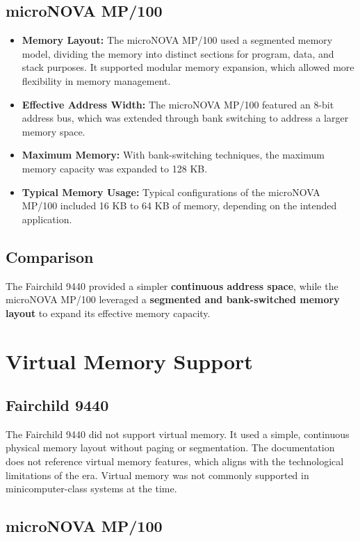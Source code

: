 \documentclass[a4paper,12pt]{article}
\begin{document}
\subsection{microNOVA MP/100}

\begin{itemize}
    \item \textbf{Memory Layout:} The microNOVA MP/100 used a segmented memory model, dividing the memory into distinct sections for program, data, and stack purposes. It supported modular memory expansion, which allowed more flexibility in memory management.
    \item \textbf{Effective Address Width:} The microNOVA MP/100 featured an 8-bit address bus, which was extended through bank switching to address a larger memory space.
    \item \textbf{Maximum Memory:} With bank-switching techniques, the maximum memory capacity was expanded to 128 KB.
    \item \textbf{Typical Memory Usage:} Typical configurations of the microNOVA MP/100 included 16 KB to 64 KB of memory, depending on the intended application.
\end{itemize}

\subsection{Comparison}

The Fairchild 9440 provided a simpler \textbf{continuous address space}, while the microNOVA MP/100 leveraged a \textbf{segmented and bank-switched memory layout} to expand its effective memory capacity.


\section{Virtual Memory Support}

\subsection{Fairchild 9440}

The Fairchild 9440 did not support virtual memory. It used a simple, continuous physical memory layout without paging or segmentation. The documentation does not reference virtual memory features, which aligns with the technological limitations of the era. Virtual memory was not commonly supported in minicomputer-class systems at the time.

\subsection{microNOVA MP/100}
\end{document}
